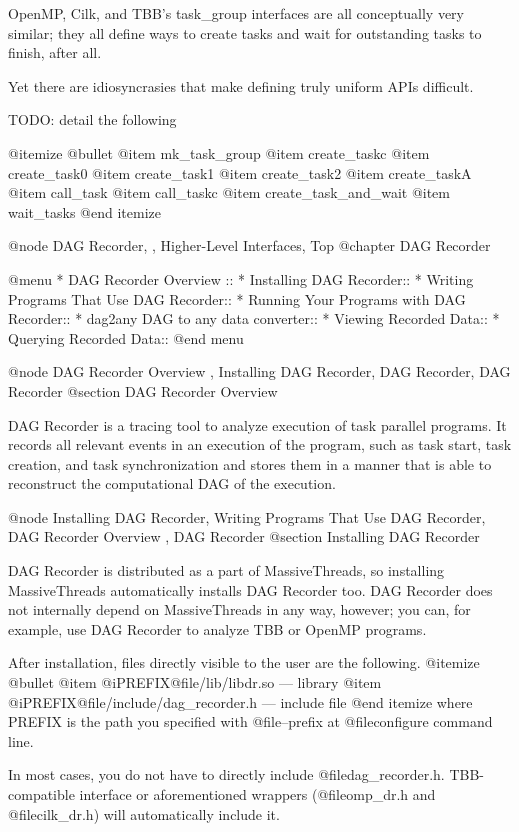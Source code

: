 OpenMP, Cilk, and TBB's task_group interfaces are all conceptually very
similar; they all define ways to create tasks and wait for outstanding
tasks to finish, after all.

Yet there are idiosyncrasies that make defining truly uniform APIs
difficult.  

TODO: detail the following

@itemize @bullet
@item mk_task_group
@item create_taskc
@item create_task0
@item create_task1
@item create_task2
@item create_taskA
@item call_task
@item call_taskc
@item create_task_and_wait
@item wait_tasks
@end itemize

@node DAG Recorder,  , Higher-Level Interfaces, Top
@chapter DAG Recorder

@menu
* DAG Recorder Overview ::
* Installing DAG Recorder::
* Writing Programs That Use DAG Recorder::
* Running Your Programs with DAG Recorder::
* dag2any DAG to any data converter::
* Viewing Recorded Data::
* Querying Recorded Data::
@end menu

@node DAG Recorder Overview , Installing DAG Recorder, DAG Recorder, DAG Recorder
@section DAG Recorder Overview 

DAG Recorder is a tracing tool to analyze execution of task parallel
programs.  It records all relevant events in an execution of the
program, such as task start, task creation, and task synchronization and
stores them in a manner that is able to reconstruct the computational
DAG of the execution.

@node Installing DAG Recorder, Writing Programs That Use DAG Recorder, DAG Recorder Overview , DAG Recorder
@section Installing DAG Recorder

DAG Recorder is distributed as a part of MassiveThreads, so installing
MassiveThreads automatically installs DAG Recorder too.  DAG Recorder
does not internally depend on MassiveThreads in any way, however; you
can, for example, use DAG Recorder to analyze TBB or OpenMP programs.  

After installation, files directly visible to the user are the following.
@itemize @bullet
@item @i{PREFIX}@file{/lib/libdr.so} --- library
@item @i{PREFIX}@file{/include/dag_recorder.h} --- include file
@end itemize
where PREFIX is the path you specified with @file{--prefix} at
@file{configure} command line.  

In most cases, you do not have to directly include
@file{dag_recorder.h}.  TBB-compatible interface or aforementioned
wrappers (@file{omp_dr.h} and @file{cilk_dr.h}) will automatically
include it.

